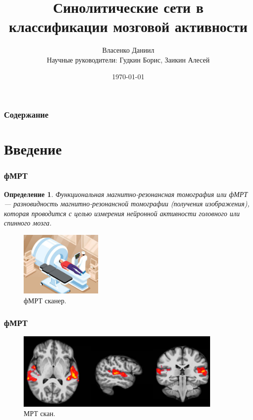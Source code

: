 \documentclass{beamer}
\newtheorem{definition_}{Определение}
\begin{document}
	\title{Синолитические сети в классификации мозговой активности}  
	\author{Власенко Даниил\\
	{\footnotesize Научные руководители: Гудкин Борис, Заикин Алесей}}
	\date{\today} 
	
	\begin{frame}
		\titlepage
	\end{frame}

	\begin{frame}
		\frametitle{Содержание}
		\tableofcontents
	\end{frame} 

	\section{Введение} 
	\begin{frame}
		\frametitle{фМРТ} 
							
		\begin{definition_}
			Функциональная магнитно-резонансная томография или фМРТ — разновидность магнитно-резонансной томографии (получения изображения), которая проводится с целью измерения нейронной активности головного или спинного мозга.
		\end{definition_}
	
		\begin{figure}
			\includegraphics[width=4cm]{../images/fmri_1.jpeg}
			\caption{фМРТ сканер.} 
			\label{fg:1}
		\end{figure}		
	\end{frame}

	\begin{frame} 
		\frametitle{фМРТ}
		\begin{figure}
			\includegraphics[width=10cm]{../images/fmri_2.png}
			\caption{МРТ скан.} 
			\label{fg:2}
		\end{figure}
	\end{frame}
\end{document}
